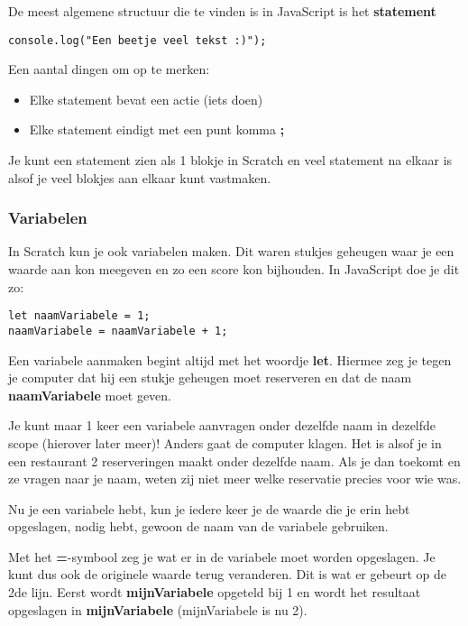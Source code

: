 De meest algemene structuur die te vinden is in JavaScript is het
\textbf{statement} 
\begin{verbatim}
console.log("Een beetje veel tekst :)");
\end{verbatim}
Een aantal dingen om op te merken:
\begin{itemize}
    \item Elke statement bevat een actie (iets doen)
    \item Elke statement eindigt met een punt komma \textbf{;} 
\end{itemize}

Je kunt een statement zien als 1 blokje in Scratch en veel statement na elkaar
is alsof je veel blokjes aan elkaar kunt vastmaken.

\subsubsection{Variabelen}%
\label{ssub:Variabelen}

In Scratch kun je ook variabelen maken. Dit waren stukjes geheugen waar je een 
waarde aan kon meegeven en zo een score kon bijhouden. In JavaScript doe je dit
zo:
\begin{verbatim}
let naamVariabele = 1;
naamVariabele = naamVariabele + 1;
\end{verbatim}
Een variabele aanmaken begint altijd met het woordje \textbf{let}. Hiermee zeg
je tegen je computer dat hij een stukje geheugen moet reserveren en dat de naam
\textbf{naamVariabele} moet geven.

\Opm Je kunt maar 1 keer een variabele aanvragen onder dezelfde naam in
dezelfde scope (hierover later meer)! Anders gaat de computer klagen. Het is
alsof je in een restaurant 2 reserveringen maakt onder  dezelfde naam. Als je
dan toekomt en ze vragen naar je naam, weten zij niet meer welke reservatie
precies voor wie was.

Nu je een variabele hebt, kun je iedere keer je de waarde die je erin hebt
opgeslagen, nodig hebt, gewoon de naam van de variabele gebruiken.

Met het \textbf{=}-symbool zeg je wat er in de variabele moet worden opgeslagen.
Je kunt dus ook de originele waarde terug veranderen. Dit is wat er gebeurt op
de 2de lijn. Eerst wordt \textbf{mijnVariabele} opgeteld bij 1 en wordt het
resultaat opgeslagen in \textbf{mijnVariabele} (mijnVariabele is nu 2).


